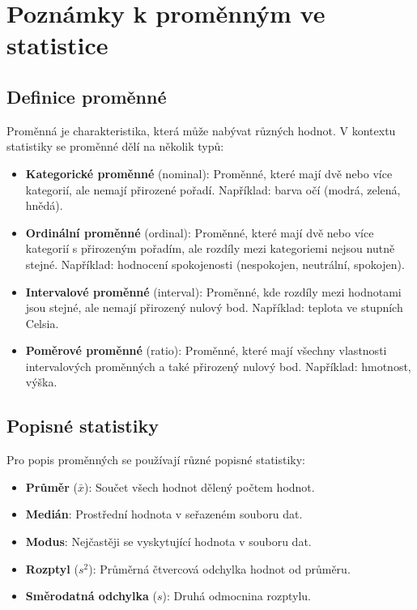 \documentclass{article}
\begin{document}
\section*{Poznámky k proměnným ve statistice}

\subsection*{Definice proměnné}
Proměnná je charakteristika, která může nabývat různých hodnot. V kontextu statistiky se proměnné dělí na několik typů:

\begin{itemize}
    \item \textbf{Kategorické proměnné} (nominal): Proměnné, které mají dvě nebo více kategorií, ale nemají přirozené pořadí. Například: barva očí (modrá, zelená, hnědá).
    \item \textbf{Ordinální proměnné} (ordinal): Proměnné, které mají dvě nebo více kategorií s přirozeným pořadím, ale rozdíly mezi kategoriemi nejsou nutně stejné. Například: hodnocení spokojenosti (nespokojen, neutrální, spokojen).
    \item \textbf{Intervalové proměnné} (interval): Proměnné, kde rozdíly mezi hodnotami jsou stejné, ale nemají přirozený nulový bod. Například: teplota ve stupních Celsia.
    \item \textbf{Poměrové proměnné} (ratio): Proměnné, které mají všechny vlastnosti intervalových proměnných a také přirozený nulový bod. Například: hmotnost, výška.
\end{itemize}

\subsection*{Popisné statistiky}
Pro popis proměnných se používají různé popisné statistiky:

\begin{itemize}
    \item \textbf{Průměr} (\(\bar{x}\)): Součet všech hodnot dělený počtem hodnot.
    \item \textbf{Medián}: Prostřední hodnota v seřazeném souboru dat.
    \item \textbf{Modus}: Nejčastěji se vyskytující hodnota v souboru dat.
    \item \textbf{Rozptyl} (\(s^2\)): Průměrná čtvercová odchylka hodnot od průměru.
    \item \textbf{Směrodatná odchylka} (\(s\)): Druhá odmocnina rozptylu.
\end{itemize}
\end{document}
